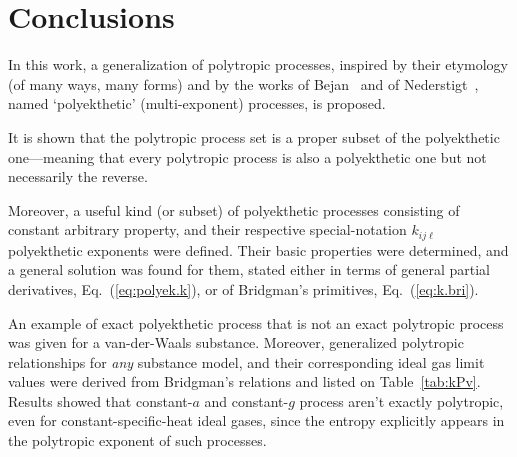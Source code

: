\section{Conclusions}

    In this work, a generalization of polytropic processes, inspired by their etymology (of many
    ways,  many  forms)  and   by   the   works   of   Bejan~\cite{2006-BejanA-Wiley}   and   of
    Nederstigt~\cite{2017-NederstigtP-TUDelft}, named `polyekthetic' (multi-exponent) processes,
    is proposed.

    It is shown that the  polytropic  process  set  is  a  proper  subset  of  the  polyekthetic
    one---meaning that every polytropic process is also a polyekthetic one but  not  necessarily
    the reverse.

    Moreover, a useful kind  (or  subset)  of  polyekthetic  processes  consisting  of  constant
    arbitrary  property,  and  their  respective  special-notation   $k_{ij\ell}$   polyekthetic
    exponents were defined. Their basic properties were determined, and a general  solution  was
    found   for   them,   stated   either   in   terms   of   general    partial    derivatives,
    Eq.~(\ref{eq:polyek.k}), or of Bridgman's primitives, Eq.~(\ref{eq:k.bri}).

    An example of exact polyekthetic process that is not an exact polytropic process  was  given
    for a van-der-Waals substance. Moreover, generalized polytropic relationships for \emph{any}
    substance model, and their corresponding ideal gas limit values were derived from Bridgman's
    relations  and  listed  on  Table~\ref{tab:kPv}.  Results  showed  that   constant-$a$   and
    constant-$g$ process aren't exactly polytropic, even for constant-specific-heat ideal gases,
    since the entropy explicitly appears in the polytropic exponent of such processes.


